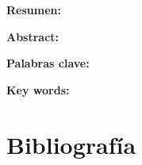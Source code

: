 \documentclass[12pt]{article}
\begin{document}
\newpage
\justifying


\textbf{Resumen:}



\vline

\textbf{Abstract:}


\vline

\textbf{Palabras clave:}



\vline

\textbf{Key words:}



\newpage
\tableofcontents

\newpage
\listoffigures

\newpage
\listoftables

\newpage



\newpage


\newpage


\newpage


\newpage


\newpage
\section{Bibliografía}
\renewcommand{\bibitemsep}{1em}
\printbibliography[heading=empty]
\end{document}
